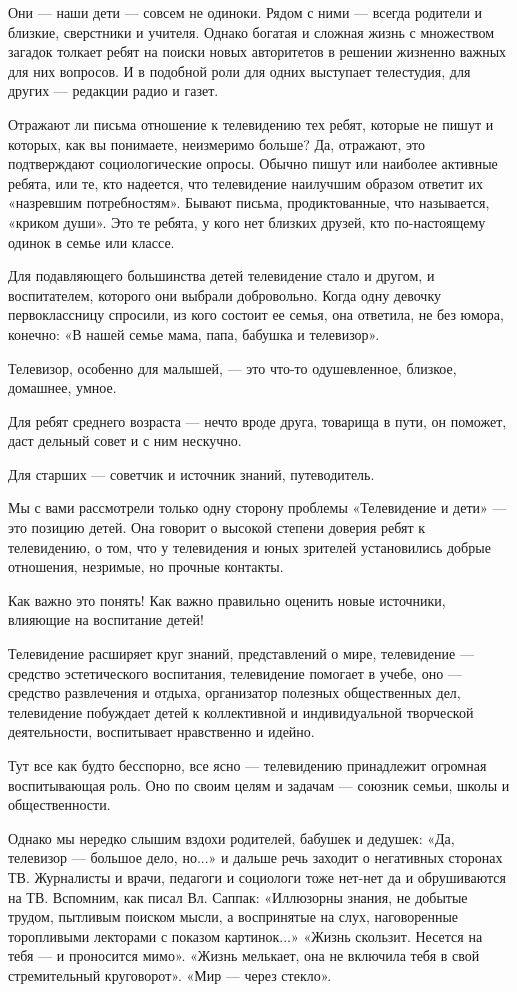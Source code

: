 \documentclass[12pt, a4paper, openany]{book}
\begin{document}
Они — наши дети — совсем не одиноки. Рядом с ними — всегда родители и близкие, сверстники и учителя. Однако богатая и сложная жизнь с множеством загадок толкает ребят на поиски новых авторитетов в решении жизненно важных для них вопросов. И в подобной роли для одних выступает телестудия, для других — редакции радио и газет. 

Отражают ли письма отношение к телевидению тех ребят, которые не пишут и которых, как вы понимаете, неизмеримо больше? Да, отражают, это подтверждают социологические опросы. Обычно пишут или наиболее активные ребята, или те, кто надеется, что телевидение наилучшим образом ответит их «назревшим потребностям». Бывают письма, продиктованные, что называется, «криком души». Это те ребята, у кого нет близких друзей, кто по-настоящему одинок в семье или классе. 

Для подавляющего большинства детей телевидение стало и другом, и воспитателем, которого они выбрали добровольно. Когда одну девочку первоклассницу спросили, из кого состоит ее семья, она ответила, не без юмора, конечно: «В нашей семье мама, папа, бабушка и телевизор». 

Телевизор, особенно для малышей, — это что-то одушевленное, близкое, домашнее, умное. 

Для ребят среднего возраста — нечто вроде друга, товарища в пути, он поможет, даст дельный совет и с ним нескучно. 

Для старших — советчик и источник знаний, путеводитель. 

Мы с вами рассмотрели только одну сторону проблемы «Телевидение и дети» —это позицию детей. Она говорит о высокой степени доверия ребят к телевидению, о том, что у телевидения и юных зрителей установились добрые отношения, незримые, но прочные контакты. 

Как важно это понять! Как важно правильно оценить новые источники, влияющие на воспитание детей! 

Телевидение расширяет круг знаний, представлений о мире, телевидение — средство эстетического воспитания, телевидение помогает в учебе, оно — средство развлечения и отдыха, организатор полезных общественных дел, телевидение побуждает детей к коллективной и индивидуальной творческой деятельности, воспитывает нравственно и идейно. 

Тут все как будто бесспорно, все ясно — телевидению принадлежит огромная воспитывающая роль. Оно по своим целям и задачам — союзник семьи, школы и общественности. 

Однако мы нередко слышим вздохи родителей, бабушек и дедушек: «Да, телевизор — большое дело, но...» и дальше речь заходит о негативных сторонах ТВ. Журналисты и врачи, педагоги и социологи тоже нет-нет да и обрушиваются на ТВ. Вспомним, как писал Вл. Саппак: «Иллюзорны знания, не добытые трудом, пытливым поиском мысли, а воспринятые на слух, наговоренные торопливыми лекторами с показом картинок...» «Жизнь скользит. Несется на тебя — и проносится мимо». «Жизнь мелькает, она не включила тебя в свой стремительный круговорот». «Мир — через стекло». 
\end{document}
